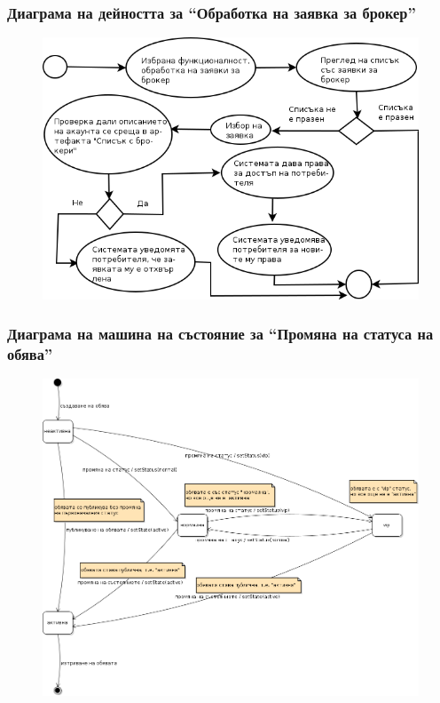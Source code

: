 \documentclass[12pt]{beamer}
\begin{document}
\begin{frame}[fragile]
\frametitle{Диаграма на дейността за ``Обработка на заявка за брокер''}
        \begin{figure}[h]
        \centering
		\includegraphics[scale=0.4,keepaspectratio=true]{uml06}
        \end{figure}
\end{frame}

\begin{frame}[fragile]
\frametitle{Диаграма на машина на състояние за ``Промяна на статуса на обява''}
        \begin{figure}[h]
        \centering
		\includegraphics[scale=0.22,keepaspectratio=true]{uml07}
        \end{figure}
\end{frame}
\end{document}
